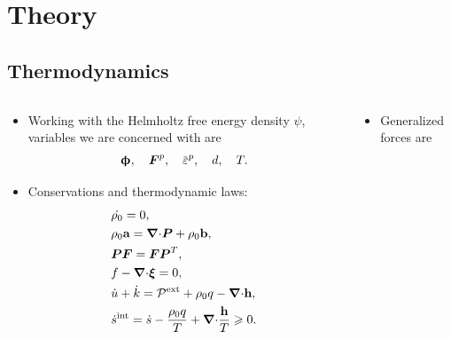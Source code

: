\section{Theory}

\sectioncover

\subsection{Thermodynamics}

\begin{frame}
  \vspace{-2em}
  \begin{columns}
    \begin{column}{0.4\textwidth}
      \begin{itemize}
        \item  Working with the Helmholtz free energy density $\psi$, variables we are concerned with are
              \begin{align*}
                \bs{\upphi}, \quad \defgrad^p, \quad \ep, \quad d, \quad T.
              \end{align*}
        \item Conservations and thermodynamic laws:
              \begin{align*}
                 & \dot{\rho_0} = 0,                                                                             \\
                 & \rho_0 \textbf{a} = {\boldsymbol{\nabla} \cdot} \boldsymbol{P} + \rho_0\textbf{b},                                                  \\
                 & \boldsymbol{P}\boldsymbol{F} = \boldsymbol{F}\boldsymbol{P}^T,                                                                \\
                 & f -{\boldsymbol{\nabla} \cdot} \boldsymbol{\xi} = 0,                                                                  \\
                 & \dot{u} + \dot{k} = \mathcal{P}^\text{ext} + \rho_0 q - {\boldsymbol{\nabla} \cdot} \textbf{h},                     \\
                 & \dot{s}^\text{int} = \dot{s} - \dfrac{\rho_0 q}{T} + {\boldsymbol{\nabla} \cdot} \dfrac{\textbf{h}}{T} \geqslant 0. 
              \end{align*}
      \end{itemize}
    \end{column}
    \pause
    \begin{column}{0.6\textwidth}
      \begin{itemize}
        \item Generalized forces are

\end{itemize}
\end{column}
\end{columns}
\end{frame}
